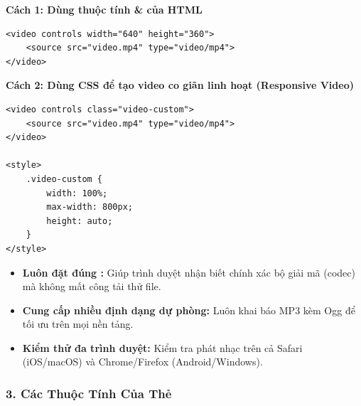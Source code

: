 \textbf{Cách 1: Dùng thuộc tính  \&  của HTML}
\begin{codeWindow}
\begin{lstlisting}[language=HTML5]
<video controls width="640" height="360">
    <source src="video.mp4" type="video/mp4">
</video>
\end{lstlisting}
\end{codeWindow}
\textbf{Cách 2: Dùng CSS để tạo video co giãn linh hoạt (Responsive Video)}
\begin{codeWindow}
\begin{lstlisting}[language=HTML5]
<video controls class="video-custom">
    <source src="video.mp4" type="video/mp4">
</video>

<style>
    .video-custom {
        width: 100%;
        max-width: 800px;
        height: auto;
    }
</style>
\end{lstlisting}
\end{codeWindow}

\begin{tipBox}
\begin{itemize}[leftmargin=1.5em, itemsep=2pt, parsep=0pt]
    \item \textbf{Luôn đặt đúng :} Giúp trình duyệt nhận biết chính xác bộ giải mã (codec) mà không mất công tải thử file.
    \item \textbf{Cung cấp nhiều định dạng dự phòng:} Luôn khai báo MP3 kèm Ogg để tối ưu trên mọi nền tảng.
    \item \textbf{Kiểm thử đa trình duyệt:} Kiểm tra phát nhạc trên cả Safari (iOS/macOS) và Chrome/Firefox (Android/Windows).
\end{itemize}
\end{tipBox}

\subsubsection{3. Các Thuộc Tính Của Thẻ }


